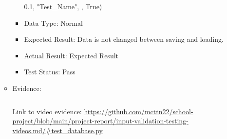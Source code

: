 \documentclass[./project-report/src/latex/project-report.tex]{subfiles}
\begin{document}
\begin{itemize}
\begin{itemize}
\begin{itemize}
                      0.1, \newline
                      "Test\_Name", , \newline
                      True)
				\item Data Type: Normal
				\item Expected Result: Data is not changed between saving and loading.
				\item Actual Result: Expected Result
				\item Test Status: Pass
			\end{itemize}
            \item Evidence:
                \inputminted{python}{./school_project/test/test_database.py}
				\begin{figure}[h!]
				\centering
				\end{figure}

				Link to video evidence: \url{https://github.com/mcttn22/school-project/blob/main/project-report/input-validation-testing-videos.md/#test_database.py}
		\end{itemize}
    

\end{itemize}
\end{document}
